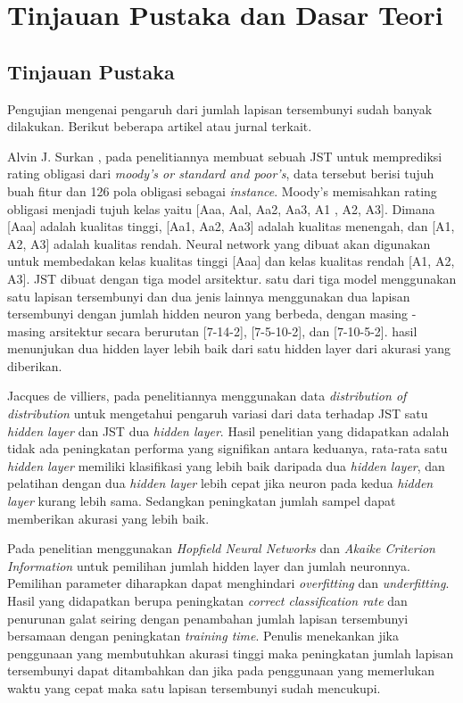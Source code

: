 \chapter{Tinjauan Pustaka dan Dasar Teori}

\section{Tinjauan Pustaka}

Pengujian mengenai pengaruh dari jumlah lapisan tersembunyi sudah banyak dilakukan. Berikut beberapa artikel atau jurnal terkait.

Alvin J. Surkan \cite{NeuralNetforBondRating}, pada penelitiannya membuat sebuah JST untuk memprediksi rating obligasi dari \textit{moody's or standard and poor's}, data tersebut berisi tujuh buah fitur dan 126 pola obligasi sebagai \textit{instance}. Moody's memisahkan rating obligasi menjadi tujuh kelas yaitu [Aaa, Aal, Aa2, Aa3, A1 , A2, A3]. Dimana  [Aaa] adalah kualitas tinggi, [Aa1, Aa2, Aa3] adalah kualitas menengah, dan [A1, A2, A3] adalah kualitas rendah. Neural network yang dibuat akan digunakan untuk membedakan kelas kualitas tinggi [Aaa] dan kelas kualitas rendah [A1, A2, A3]. JST dibuat dengan tiga model arsitektur. satu dari tiga model menggunakan satu lapisan tersembunyi dan dua jenis lainnya menggunakan dua lapisan tersembunyi dengan jumlah hidden neuron yang berbeda, dengan masing - masing arsitektur secara berurutan [7-14-2], [7-5-10-2], dan [7-10-5-2]. hasil menunjukan dua hidden layer lebih baik dari satu hidden layer dari akurasi yang diberikan. 

Jacques de villiers\cite{backpropagationwith1and2}, pada penelitiannya menggunakan data \textit{distribution of distribution} untuk mengetahui pengaruh variasi dari data terhadap JST satu \textit{hidden layer} dan JST dua \textit{hidden layer}. Hasil penelitian yang didapatkan adalah tidak ada peningkatan performa yang signifikan antara keduanya, rata-rata satu \textit{hidden layer} memiliki klasifikasi yang lebih baik daripada dua \textit{hidden layer}, dan pelatihan dengan dua \textit{hidden layer} lebih cepat jika neuron pada kedua \textit{hidden layer} kurang lebih sama. Sedangkan peningkatan jumlah sampel dapat memberikan akurasi yang lebih baik.

Pada penelitian\cite{Panchal2011} menggunakan \textit{Hopfield Neural Networks} dan \textit{Akaike Criterion Information} untuk pemilihan jumlah hidden layer dan jumlah neuronnya. Pemilihan parameter diharapkan dapat menghindari \textit{overfitting} dan \textit{underfitting}. Hasil yang didapatkan berupa peningkatan \textit{correct classification rate} dan penurunan galat seiring dengan penambahan jumlah lapisan tersembunyi bersamaan dengan peningkatan \textit{training time}. Penulis menekankan jika penggunaan yang membutuhkan akurasi tinggi maka peningkatan jumlah lapisan tersembunyi dapat ditambahkan dan jika pada penggunaan yang memerlukan waktu yang cepat maka satu lapisan tersembunyi sudah mencukupi.


